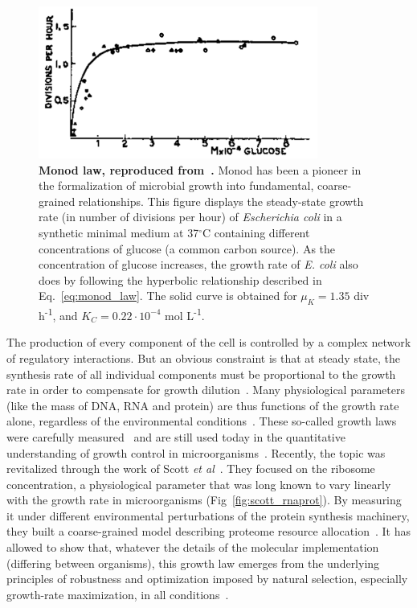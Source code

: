 \begin{figure}[tb]
\centering
\includegraphics[height=5cm]{./Fig/Chapter1/monod_law}
\caption{
\textbf{Monod law, reproduced from~\cite{monod_growth_1949}.}
Monod has been a pioneer in the formalization of microbial growth into fundamental, coarse-grained relationships.
This figure displays the steady-state growth rate (in number of divisions per hour) of \textit{Escherichia coli} in a synthetic minimal medium at 37$^{\circ}$C containing different concentrations of glucose (a common carbon source).
As the concentration of glucose increases, the growth rate of \textit{E. coli} also does by following the hyperbolic relationship described in Eq.~\ref{eq:monod_law}.
The solid curve is obtained for $\mu_K = 1.35$ div h\textsuperscript{-1}, and $K_C = 0.22 \cdot 10^{-4}$ mol L\textsuperscript{-1}.
}
\label{fig:monod_law}
\end{figure}

The production of every component of the cell is controlled by a complex network of regulatory interactions.
But an obvious constraint is that at steady state, the synthesis rate of all individual components must be proportional to the growth rate in order to compensate for growth dilution~\cite{monod_growth_1949}.
Many physiological parameters (like the mass of DNA, RNA and protein) are thus functions of the growth rate alone, regardless of the environmental conditions~\cite{schaechter_dependency_1958,bremer_modulation_1996}.
These so-called growth laws were carefully measured~\cite{bremer_modulation_1996} and are still used today in the quantitative understanding of growth control in microorganisms~\cite{ehrenberg_mediumdependent_2012}.
Recently, the topic was revitalized through the work of Scott \textit{et al}~\cite{scott_bacterial_2011}.
They focused on the ribosome concentration, a physiological parameter that was long known to vary linearly with the growth rate in microorganisms (Fig~\ref{fig:scott_rnaprot}).
By measuring it under different environmental perturbations of the protein synthesis machinery, they built a coarse-grained model describing proteome resource allocation~\cite{scott_emergence_2014}.
It has allowed to show that, whatever the details of the molecular implementation (differing between organisms), this growth law emerges from the underlying principles of robustness and optimization imposed by natural selection, especially growth-rate maximization, in all conditions~\cite{scott_emergence_2014}.

